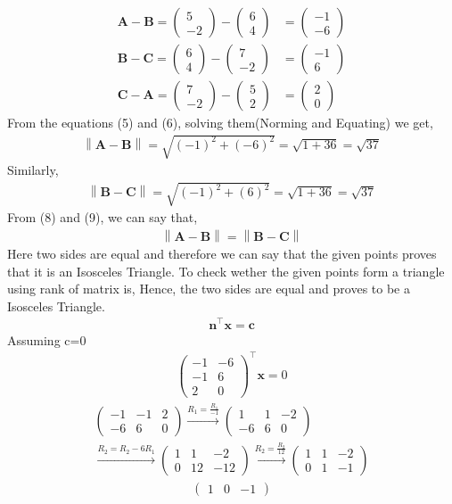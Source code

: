 \documentclass[12pt]{article}
\providecommand{\norm}[1]{\left\lVert#1\right\rVert}
\newcommand{\myvec}[1]{\ensuremath{\begin{pmatrix}#1\end{pmatrix}}}
\let\vec\mathbf
\begin{document}
\begin{enumerate}
\begin{align}
\vec{A}-\vec{B} = \myvec{5\\-2} - \myvec{6\\4} &= \myvec{-1\\-6} \\
\vec{B}-\vec{C} = \myvec{6\\4} - \myvec{7\\-2} &= \myvec{-1\\6} \\
\vec{C}-\vec{A} = \myvec{7\\-2} - \myvec{5\\2} &= \myvec{2\\0}
	\end{align}
From the equations (5) and (6), solving them(Norming and Equating) we get,
	\begin{align}
\norm{\vec{A}-\vec{B}} = \sqrt{(-1)^2+(-6)^2} = \sqrt{1+36} = \sqrt{37}
 	\end{align}
Similarly,
	\begin{align}
\norm{\vec{B}-\vec{C}} = \sqrt{(-1)^2+(6)^2} = \sqrt{1+36} = \sqrt{37} 
	\end{align}
From (8) and (9), we can say that,
	\begin{align}
\norm{\vec{A}-\vec{B}} = \norm{\vec{B}-\vec{C}} 
	\end{align}
Here two sides are equal and therefore we can say that the given points proves that it is an Isosceles Triangle.
To check wether the given points form a triangle using rank of matrix is,
Hence, the two sides are equal and proves to be a Isosceles Triangle.
	\begin{align}
\vec{n}^\top\vec{x}=\vec{c}
	\end{align}
Assuming c=0
	\begin{align}
\myvec{
-1 & -6
\\
-1 & 6
\\
2 & 0
}^\top\vec{x}=0
	\end{align}
	\begin{align}
\myvec{
-1 & -1 & 2
\\
-6 & 6 & 0
}\xrightarrow[]{R_1=\frac{R_1}{-1}}
\myvec{
1 & 1 & -2
\\
-6 & 6 & 0
}
\\\xrightarrow[]{R_2=R_2-6R_1}
\myvec{
1 & 1 & -2
\\
0 & 12 & -12
}
\xrightarrow[]{R_2=\frac{R_2}{12}}
\myvec{
1 & 1 & -2
\\
0 & 1 & -1
}
	\end{align}
	\begin{align}
\myvec{
1 & 0 & -1
}
\end{align}
\end{enumerate}
\end{document}
